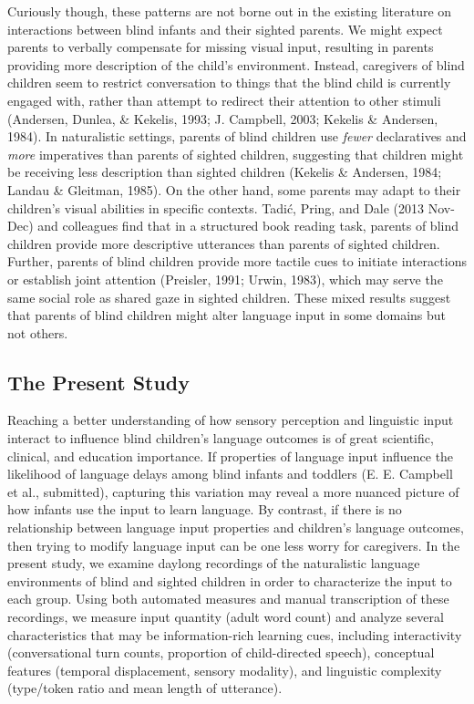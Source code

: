 \documentclass[
  man,floatsintext]{apa6}
\begin{document}
Curiously though, these patterns are not borne out in the existing literature on interactions between blind infants and their sighted parents. We might expect parents to verbally compensate for missing visual input, resulting in parents providing more description of the child's environment. Instead, caregivers of blind children seem to restrict conversation to things that the blind child is currently engaged with, rather than attempt to redirect their attention to other stimuli (Andersen, Dunlea, \& Kekelis, 1993; J. Campbell, 2003; Kekelis \& Andersen, 1984). In naturalistic settings, parents of blind children use \emph{fewer} declaratives and \emph{more} imperatives than parents of sighted children, suggesting that children might be receiving less description than sighted children (Kekelis \& Andersen, 1984; Landau \& Gleitman, 1985). On the other hand, some parents may adapt to their children's visual abilities in specific contexts. Tadić, Pring, and Dale (2013 Nov-Dec) and colleagues find that in a structured book reading task, parents of blind children provide more descriptive utterances than parents of sighted children. Further, parents of blind children provide more tactile cues to initiate interactions or establish joint attention (Preisler, 1991; Urwin, 1983), which may serve the same social role as shared gaze in sighted children. These mixed results suggest that parents of blind children might alter language input in some domains but not others.

\hypertarget{the-present-study}{%
\subsection{The Present Study}\label{the-present-study}}

Reaching a better understanding of how sensory perception and linguistic input interact to influence blind children's language outcomes is of great scientific, clinical, and education importance. If properties of language input influence the likelihood of language delays among blind infants and toddlers (E. E. Campbell et al., submitted), capturing this variation may reveal a more nuanced picture of how infants use the input to learn language. By contrast, if there is no relationship between language input properties and children's language outcomes, then trying to modify language input can be one less worry for caregivers. In the present study, we examine daylong recordings of the naturalistic language environments of blind and sighted children in order to characterize the input to each group. Using both automated measures and manual transcription of these recordings, we measure input quantity (adult word count) and analyze several characteristics that may be information-rich learning cues, including interactivity (conversational turn counts, proportion of child-directed speech), conceptual features (temporal displacement, sensory modality), and linguistic complexity (type/token ratio and mean length of utterance).
\end{document}
